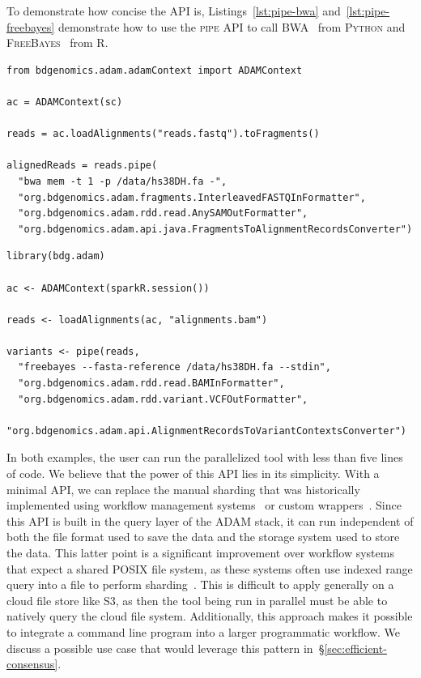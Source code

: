 \documentclass[phd]{ucbthesis}
\begin{document}
To demonstrate how concise the API is, Listings~\ref{lst:pipe-bwa}
and~\ref{lst:pipe-freebayes} demonstrate how to use the \textsc{pipe}
API to call BWA~\cite{li09bwa} from \textsc{Python} and
\textsc{FreeBayes}~\cite{garrison12} from R.

\begin{lstlisting}[caption=Calling BWA using the \textsc{Python pipe} API, label=lst:pipe-bwa]
from bdgenomics.adam.adamContext import ADAMContext

ac = ADAMContext(sc)

reads = ac.loadAlignments("reads.fastq").toFragments()

alignedReads = reads.pipe(
  "bwa mem -t 1 -p /data/hs38DH.fa -",
  "org.bdgenomics.adam.fragments.InterleavedFASTQInFormatter",
  "org.bdgenomics.adam.rdd.read.AnySAMOutFormatter",
  "org.bdgenomics.adam.api.java.FragmentsToAlignmentRecordsConverter")
\end{lstlisting}

\begin{lstlisting}[caption=Calling \textsc{FreeBayes} using the R \textsc{pipe} API, label=lst:pipe-freebayes]
library(bdg.adam)

ac <- ADAMContext(sparkR.session())

reads <- loadAlignments(ac, "alignments.bam")

variants <- pipe(reads,
  "freebayes --fasta-reference /data/hs38DH.fa --stdin",
  "org.bdgenomics.adam.rdd.read.BAMInFormatter",
  "org.bdgenomics.adam.rdd.variant.VCFOutFormatter",
  "org.bdgenomics.adam.api.AlignmentRecordsToVariantContextsConverter")
\end{lstlisting}

In both examples, the user can run the parallelized tool with less than five
lines of code. We believe that the power of this API lies in its simplicity.
With a minimal API, we can replace the manual sharding that was historically
implemented using workflow management systems~\cite{depristo11, chiang15} or
custom wrappers~\cite{langmead09, schatz09, pireddu11, nellore16}. Since this
API is built in the query layer of the \textsc{ADAM} stack, it can run
independent of both the file format used to save the data and the storage
system used to store the data. This latter point is a significant improvement
over workflow systems that expect a shared POSIX file system, as these systems
often use indexed range query into a file to perform sharding~\cite{chiang15}.
This is difficult to apply generally on a cloud file store like S3, as then the
tool being run in parallel must be able to natively query the cloud file system.
Additionally, this approach makes it possible to integrate a command line
program into a larger programmatic workflow. We discuss a possible use case that
would leverage this pattern in~\S\ref{sec:efficient-consensus}.
\end{document}
